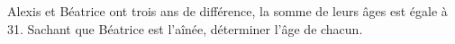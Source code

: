 Alexis et Béatrice ont trois ans de différence, la somme de leurs âges est égale à 31. 
Sachant que Béatrice est l’aînée, déterminer l’âge de chacun.